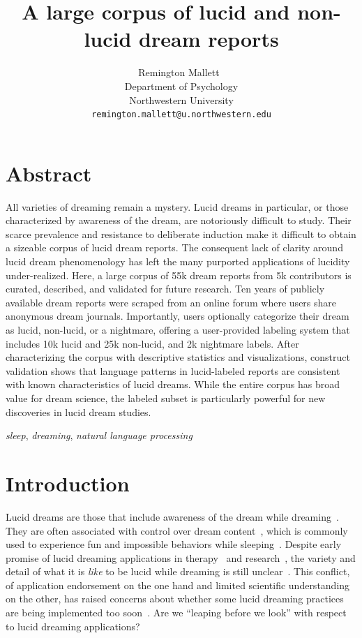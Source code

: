 \documentclass[10pt,a4paper,twocolumn]{article}
\title{\bf A large corpus of lucid and non-lucid dream reports}
\author{
    Remington Mallett~\orcidlink{0000-0001-6183-3098} \\ %
    Department of Psychology \\
    Northwestern University \\
    \texttt{remington.mallett@u.northwestern.edu}
}
\date{}
\begin{document}
\maketitle

\section*{Abstract}
All varieties of dreaming remain a mystery. Lucid dreams in particular, or those characterized by awareness of the dream, are notoriously difficult to study. Their scarce prevalence and resistance to deliberate induction make it difficult to obtain a sizeable corpus of lucid dream reports. The consequent lack of clarity around lucid dream phenomenology has left the many purported applications of lucidity under-realized. Here, a large corpus of 55k dream reports from 5k contributors is curated, described, and validated for future research. Ten years of publicly available dream reports were scraped from an online forum where users share anonymous dream journals. Importantly, users optionally categorize their dream as lucid, non-lucid, or a nightmare, offering a user-provided labeling system that includes 10k lucid and 25k non-lucid, and 2k nightmare labels. After characterizing the corpus with descriptive statistics and visualizations, construct validation shows that language patterns in lucid-labeled reports are consistent with known characteristics of lucid dreams. While the entire corpus has broad value for dream science, the labeled subset is particularly powerful for new discoveries in lucid dream studies.

\bigskip
{} \emph{sleep}, \emph{dreaming}, \emph{natural language processing}

\section{Introduction}\label{sec:introduction}

Lucid dreams are those that include awareness of the dream while dreaming~\cite{baird2019}. They are often associated with control over dream content~\cite{lemyre2020}, which is commonly used to experience fun and impossible behaviors while sleeping~\cite{stumbrys2014}. Despite early promise of lucid dreaming applications in therapy~\cite{demacedo2019} and research~\cite{konkoly2021}, the variety and detail of what it is \emph{like} to be lucid while dreaming is still unclear~\cite{mallett2021}. This conflict, of application endorsement on the one hand and limited scientific understanding on the other, has raised concerns about whether some lucid dreaming practices are being implemented too soon~\cite{vallat2019,soffer2020}. Are we ``leaping before we look'' with respect to lucid dreaming applications?
\end{document}
